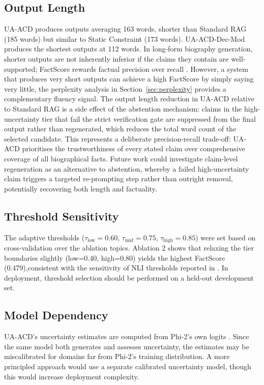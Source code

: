 \documentclass[11pt]{article}
\begin{document}
\subsection{Output Length}
UA-ACD produces outputs averaging 163 words, shorter than Standard RAG (185 words) but similar to Static Constraint (173 words). UA-ACD-Dec-Mod produces the shortest outputs at 112 words. In long-form biography generation, shorter outputs are not inherently inferior if the claims they contain are well-supported; FactScore rewards factual precision over recall \cite{min2023factscore}. However, a system that produces very short outputs can achieve a high FactScore by simply saying very little, the perplexity analysis in Section~\ref{sec:perplexity} provides a complementary fluency signal. The output length reduction in UA-ACD relative to Standard RAG is a side effect of the abstention mechanism: claims in the high-uncertainty tier that fail the strict verification gate are suppressed from the final output rather than regenerated, which reduces the total word count of the selected candidate. This represents a deliberate precision-recall trade-off: UA-ACD prioritises the trustworthiness of every stated claim over comprehensive coverage of all biographical facts. Future work could investigate claim-level regeneration as an alternative to abstention, whereby a failed high-uncertainty claim triggers a targeted re-prompting step rather than outright removal, potentially recovering both length and factuality.

\subsection{Threshold Sensitivity}
The adaptive thresholds ($\tau_{\text{low}}{=}0.60$, $\tau_{\text{mid}}{=}0.75$, $\tau_{\text{high}}{=}0.85$) were set based on cross-validation over the ablation topics. Ablation 2 shows that relaxing the tier boundaries slightly (low=0.40, high=0.80) yields the highest FactScore (0.479),consistent with the sensitivity of NLI thresholds reported in \citet{laban2022summac}. In deployment, threshold selection should be performed on a held-out development set.

\subsection{Model Dependency}
UA-ACD's uncertainty estimates are computed from Phi-2's own logits \citep{javaheripi2023phi2}. Since the same model both generates and assesses uncertainty, the estimates may be miscalibrated for domains far from Phi-2's training distribution. A more principled approach would use a separate calibrated uncertainty model, though this would increase deployment complexity.
\end{document}
